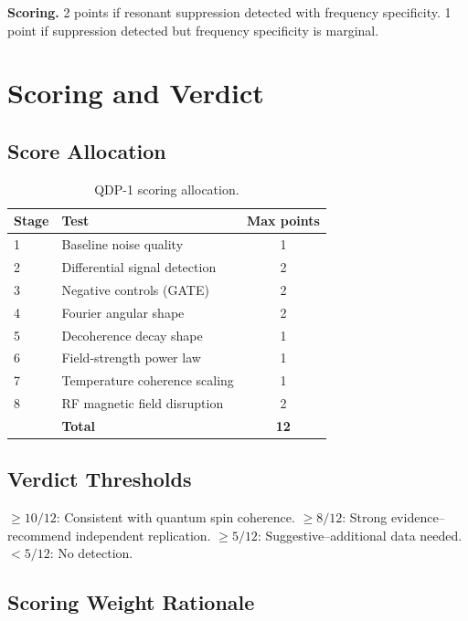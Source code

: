 \documentclass[preprint,amsmath,amssymb]{revtex4-2}
\begin{document}
\textbf{Scoring.} 2 points if resonant suppression detected with frequency specificity. 1 point if suppression detected but frequency specificity is marginal.

\section{Scoring and Verdict}

\subsection{Score Allocation}

\begin{table}[h]
\caption{QDP-1 scoring allocation.}
\begin{ruledtabular}
\begin{tabular}{llc}
Stage & Test & Max points \\
\hline
1 & Baseline noise quality & 1 \\
2 & Differential signal detection & 2 \\
3 & Negative controls (GATE) & 2 \\
4 & Fourier angular shape & 2 \\
5 & Decoherence decay shape & 1 \\
6 & Field-strength power law & 1 \\
7 & Temperature coherence scaling & 1 \\
8 & RF magnetic field disruption & 2 \\
\hline
& \textbf{Total} & \textbf{12} \\
\end{tabular}
\end{ruledtabular}
\end{table}

\subsection{Verdict Thresholds}

$\geq 10/12$: Consistent with quantum spin coherence. $\geq 8/12$: Strong evidence--recommend independent replication. $\geq 5/12$: Suggestive--additional data needed. $< 5/12$: No detection.

\subsection{Scoring Weight Rationale}
\end{document}
